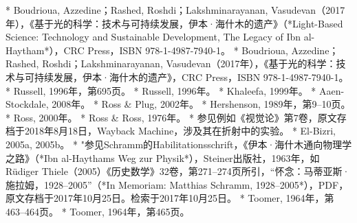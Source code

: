 \begin{enumerate}
* Boudrioua, Azzedine；Rashed, Roshdi；Lakshminarayanan, Vasudevan（2017年），《基于光的科学：技术与可持续发展，伊本·海什木的遗产》（*Light-Based Science: Technology and Sustainable Development, The Legacy of Ibn al-Haytham*），CRC Press，ISBN 978-1-4987-7940-1。
* Boudrioua, Azzedine；Rashed, Roshdi；Lakshminarayanan, Vasudevan（2017年），《基于光的科学：技术与可持续发展，伊本·海什木的遗产》，CRC Press，ISBN 978-1-4987-7940-1。
* Russell, 1996年，第695页。
* Russell, 1996年。
* Khaleefa, 1999年。
* Aaen-Stockdale, 2008年。
* Ross & Plug, 2002年。
* Hershenson, 1989年，第9–10页。
* Ross, 2000年。
* Ross & Ross, 1976年。
* 参见例如《视觉论》第7卷，原文存档于2018年8月18日，Wayback Machine，涉及其在折射中的实验。
* El-Bizri, 2005a, 2005b。
* "参见Schramm的Habilitationsschrift，《伊本·海什木通向物理学之路》（*Ibn al-Haythams Weg zur Physik*），Steiner出版社，1963年，如Rüdiger Thiele（2005）《历史数学》32卷，第271–274页所引，“怀念：马蒂亚斯·施拉姆，1928–2005”（*In Memoriam: Matthias Schramm, 1928–2005*），PDF，原文存档于2017年10月25日。检索于2017年10月25日。
* Toomer, 1964年，第463–464页。
* Toomer, 1964年，第465页。

\end{enumerate}